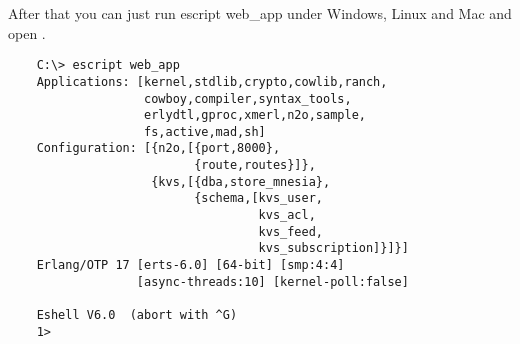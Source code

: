 After that you can just run escript web\_app under Windows, Linux and
Mac and open .

\vspace{1\baselineskip}
\begin{lstlisting}
    C:\> escript web_app
    Applications: [kernel,stdlib,crypto,cowlib,ranch,
                   cowboy,compiler,syntax_tools,
                   erlydtl,gproc,xmerl,n2o,sample,
                   fs,active,mad,sh]
    Configuration: [{n2o,[{port,8000},
                          {route,routes}]},
                    {kvs,[{dba,store_mnesia},
                          {schema,[kvs_user,
                                   kvs_acl,
                                   kvs_feed,
                                   kvs_subscription]}]}]
    Erlang/OTP 17 [erts-6.0] [64-bit] [smp:4:4]
                  [async-threads:10] [kernel-poll:false]

    Eshell V6.0  (abort with ^G)
    1>
\end{lstlisting}
\vspace{1\baselineskip}

